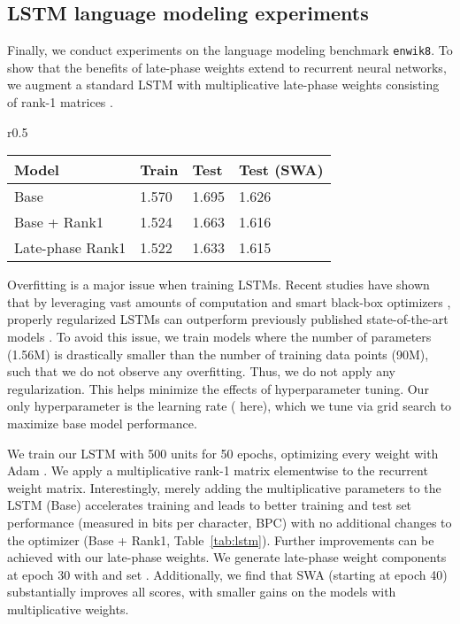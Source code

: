 \documentclass{article} \usepackage{iclr2021_conference,times}
\begin{document}
\subsection{LSTM language modeling experiments}


Finally, we conduct experiments on the language modeling benchmark \texttt{enwik8}. To show that the benefits of late-phase weights extend to recurrent neural networks, we augment a standard LSTM with multiplicative late-phase weights consisting of rank-1 matrices \citep[][cf.~Section~\ref{section:late-phase-models}]{wen_batchensemble_2020}. 

\begin{wraptable}[10]{r}{0.5\textwidth}
  \caption{\texttt{enwik8} results measured in bits per character (BPC), LSTM with 500 units. Mean ~over 5 seeds, with std.  for all results.}
  \label{tab:lstm}
  \vspace{-0.2cm}
  \centering
  {\renewcommand{\arraystretch}{1.1}\setlength{\tabcolsep}{4pt}
  \begin{tabular}{@{}llll@{}} 
    \toprule
Model & Train & Test & Test (SWA) \\\midrule
Base           &     1.570      &  1.695  & 1.626  \\
Base + Rank1    &      1.524     &  1.663  & 1.616  \\
Late-phase Rank1     &      1.522     &  1.633  &  1.615   \\\bottomrule
\end{tabular}}
\end{wraptable}
Overfitting is a major issue when training LSTMs. Recent studies have shown that by leveraging vast amounts of computation and smart black-box optimizers \citep{golovin_google_2017}, properly regularized LSTMs can outperform previously published state-of-the-art models \citep{melis_state_2017}. To avoid this issue, we train models where the number of parameters (1.56M) is drastically smaller than the number of training data points (90M), such that we do not observe any overfitting. Thus, we do not apply any regularization. This helps minimize the effects of hyperparameter tuning. Our only hyperparameter is the learning rate ( here), which we tune via grid search to maximize base model performance.

We train our LSTM with 500 units for 50 epochs, optimizing every weight with Adam \citep{kingma_adam:_2015}. We apply a multiplicative rank-1 matrix elementwise to the recurrent weight matrix. Interestingly, merely adding the multiplicative parameters to the LSTM (Base) accelerates training and leads to better training and test set performance (measured in bits per character, BPC) with no additional changes to the optimizer (Base + Rank1, Table~\ref{tab:lstm}). Further improvements can be achieved with our late-phase weights. We generate  late-phase weight components at epoch 30 with  and set . 
Additionally, we find that SWA (starting at epoch 40) substantially improves all scores, with smaller gains on the models with multiplicative weights.
\end{document}
